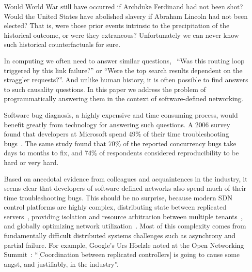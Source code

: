 
Would World War  still have occurred if Archduke Ferdinand had not been
shot? Would the United States have abolished slavery if Abraham Lincoln had
not been elected? That is,
were those prior events intrinsic to the
precipitation of the historical outcome, or
were they extraneous? Unfortunately we can never know such
historical counterfactuals for sure.

In computing we often need to answer similar questions,
\eg~``Was this routing loop triggered by this link failure?''
or ``Were the top search results dependent on the straggler requests?''.
And unlike human history, it is often possible to find answers to such
causality questions. In this paper we address the problem of programmatically answering
them in the context of software-defined networking.

Software bug diagnosis, a highly expensive and time consuming process, would benefit
greatly from technology for answering such questions. A 2006 survey found
that developers at Microsoft spend 49\% of their
time troubleshooting bugs~\cite{msoft_concurrency}. The same study found that 70\% of the reported concurrency bugs
take days to months to fix, and 74\% of
respondents considered reproducibility to be hard or very hard.

Based on anecdotal evidence from colleagues and acquaintences in the industry, it seems clear that developers of software-defined networks also spend much of their time
troubleshooting bugs. This should be no surprise, because modern SDN control platforms are highly complex,
distributing state between replicated
servers~\cite{floodlight},
providing isolation and resource arbitration between multiple
tenants~\cite{Casado:2010:VNF:1921151.1921162}, and
globally optimizing network utilization~\cite{urs}.
Most of this complexity comes from
fundamentally difficult distributed systems challenges such as asynchrony and
partial failure. For example, Google's Urs H$\ddot{\mathrm{o}}$elzle noted
at the Open Networking Summit~\cite{urs}: ``[Coordination between replicated controllers] is going to
cause some angst, and justifiably, in the industry''.

